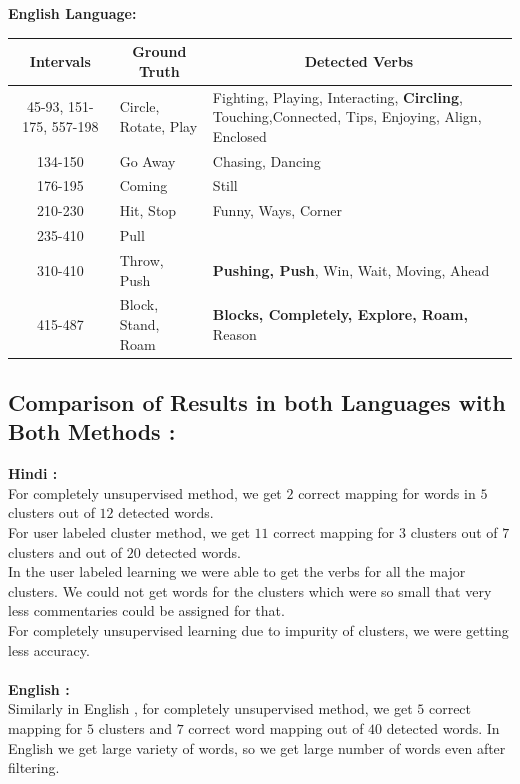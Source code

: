 \def\DevnagVersion{2.15}\documentclass[a4paper, 11pt, notitlepage]{report}
\begin{document}
{\bf English Language: \\}
\begin{center}
\begin{tabular}{||c|p{5cm}||p{6cm}||}
\hline
\multicolumn{1}{||c|}{Intervals } &\multicolumn{1}{|c||}{Ground Truth } &\multicolumn{1}{|c||}{Detected Verbs} \\
\hline
45-93, 151-175, 557-198 & Circle, Rotate, Play & Fighting, Playing, Interacting, {\bf Circling}, Touching,Connected, Tips, Enjoying, Align, Enclosed \\
\hline
134-150 & Go Away & Chasing, Dancing\\
\hline
176-195	& Coming & Still\\
\hline
210-230 & Hit, Stop & Funny, Ways, Corner \\
\hline
235-410 & Pull & \\
\hline
310-410 & Throw, Push & {\bf Pushing, Push}, Win, Wait, Moving, Ahead \\
\hline

415-487 & Block, Stand, Roam &{\bf Blocks, Completely, Explore, Roam,} Reason\\
\hline
\end{tabular}
\end{center}
\subsection{Comparison of Results in both Languages with Both Methods : }

{\bf Hindi : }\\
\hspace*{15pt} For completely unsupervised method, we get $2$ correct mapping for words in $5$ clusters out of $12$ detected words.\\
For user labeled cluster method, we get $11$ correct mapping for $3$ clusters out of $7$ clusters and out of $20$ detected words.\\
In the user labeled learning we were able to get the verbs for all the major clusters. We could not get words for the clusters which were so small that very less commentaries could be assigned for that.\\ For completely unsupervised learning due to impurity of clusters, we were getting less accuracy.\\\\ 
{\bf English :}\\
\hspace*{10pt} Similarly in English , for completely unsupervised method, we get  $5$ correct mapping for $5$ clusters and $7$ correct word mapping out of $40$ detected words. In English we get large variety of words, so we get large number of words even after filtering.
\end{document}
